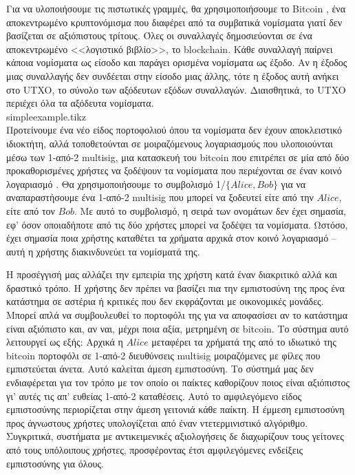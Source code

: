   Για να υλοποιήσουμε τις πιστωτικές γραμμές, θα χρησιμοποιήσουμε το \textlatin{Bitcoin} \cite{bitcoin}, ένα αποκεντρωμένο
  κρυπτονόμισμα που διαφέρει από τα συμβατικά νομίσματα γιατί δεν βασίζεται σε αξιόπιστους τρίτους. Όλες οι συναλλαγές
  δημοσιεύονται σε ένα αποκεντρωμένο <<λογιστικό βιβλίο>>, το \textlatin{block\-chain}. Κάθε συναλλαγή παίρνει κάποια
  νομίσματα ως είσοδο και παράγει ορισμένα νομίσματα ως έξοδο. Αν η έξοδος μιας συναλλαγής δεν συνδέεται στην είσοδο μιας
  άλλης, τότε η έξοδος αυτή ανήκει στο \textlatin{UTXO}, το σύνολο των αξόδευτων εξόδων συναλλαγών. Διαισθητικά, το
  \textlatin{UTXO} περιέχει όλα τα αξόδευτα νομίσματα.
  \medskip \ \\
  {simpleexample.tikz} \smallskip \ \\
  Προτείνουμε ένα νέο είδος πορτοφολιού όπου τα νομίσματα δεν έχουν αποκλειστικό ιδιοκτήτη, αλλά τοποθετούνται σε
  μοιραζόμενους λογαρια\-σμούς που υλοποιούνται μέσω των 1-από-2 \textlatin{multisig}, μια κατασκευή του \textlatin{bit\-coin}
  που επιτρέπει σε μία από δύο προκαθορισμένες χρήστες να ξοδέψουν τα νομίσματα που περιέχονται σε έναν κοινό λογαριασμό
  \cite{masteringbitcoin}. Θα χρησιμοποιήσουμε το συμβολισμό 1/$\{Alice, Bob\}$ για να αναπαραστήσουμε ένα 1-από-2
  \textlatin{multisig} που μπορεί να ξοδευτεί είτε από την $Alice$, είτε από τον $Bob$. Με αυτό το συμβολισμό, η σειρά των
  ονομάτων δεν έχει σημασία, εφ' όσον οποιαδήποτε από τις δύο χρήστες μπορεί να ξοδέψει τα νομίσματα. Ωστόσο, έχει σημασία
  ποια χρήστης καταθέτει τα χρήματα αρχικά στον κοινό λογαριασμό -- αυτή η χρήστης διακινδυνεύει τα νομίσματά της.

  Η προσέγγισή μας αλλάζει την εμπειρία της χρήστη κατά έναν διακριτικό αλλά και δραστικό τρόπο. Η χρήστης δεν πρέπει να
  βασίζει πια την εμπιστοσύνη της προς ένα κατάστημα σε αστέρια ή κριτικές που δεν εκφράζονται με οικονομικές μονάδες. Μπορεί
  απλά να συμβουλευθεί το πορτοφόλι της για να αποφασίσει αν το κατάστημα είναι αξιόπιστο και, αν ναι, μέχρι ποια αξία,
  μετρημένη σε \textlatin{bitcoin}. Το σύστημα αυτό λειτουργεί ως εξής: Αρχικά η $Alice$ μεταφέρει τα χρήματά της από το
  ιδιωτικό της \textlatin{bitcoin} πορτοφόλι σε 1-από-2 διευθύνσεις \textlatin{multisig} μοιραζόμενες με φίλες που
  εμπιστεύεται άνετα. Αυτό καλείται άμεση εμπιστοσύνη. Το σύστημά μας δεν ενδιαφέρεται για τον τρόπο με τον οποίο οι παίκτες
  καθορίζουν ποιος είναι αξιόπιστος γι' αυτές τις απ' ευθείας 1-από-2 καταθέσεις. Αυτό το αμφιλεγόμενο είδος εμπιστοσύνης
  περιορίζεται στην άμεση γειτονιά κάθε παίκτη. Η έμμεση εμπιστοσύνη προς άγνωστους χρήστες υπολογίζεται από έναν
  ντετερμινιστικό αλγόριθμο. Συγκριτικά, συστήματα με αντικειμενικές αξιολογήσεις δε διαχωρίζουν τους γείτονες από τους
  υπόλοιπους χρήστες, προσφέροντας έτσι αμφιλεγόμενες ενδείξεις εμπιστοσύνης για όλους.

